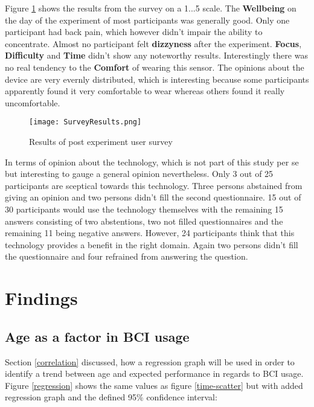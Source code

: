             Figure \ref*{survey-boxplots} shows the results from the survey on a 1...5 scale. The \textbf{Wellbeing} on the day of the experiment of most participants was generally good. Only one participant had back pain, which however didn't impair the ability to concentrate. Almost no participant felt \textbf{dizzyness} after the experiment. \textbf{Focus}, \textbf{Difficulty} and \textbf{Time} didn't show any noteworthy results. Interestingly there was no real tendency to the \textbf{Comfort} of wearing this sensor. The opinions about the device are very evernly distributed, which is interesting because some participants apparently found it very comfortable to wear whereas others found it really uncomfortable.

            \begin{figure}[h]     %
                \centering
                \texttt{[image: SurveyResults.png]} 
                \caption{Results of post experiment user survey}\label{survey-boxplots}
            \end{figure} 

            In terms of opinion about the technology, which is not part of this study per se but interesting to gauge a general opinion nevertheless. Only 3 out of 25 participants are sceptical towards this technology. Three persons abstained from giving an opinion and two persons didn't fill the second questionnaire. 15 out of 30 participants would use the technology themselves with the remaining 15 answers consisting of two abstentions, two not filled questionnaires and the remaining 11 being negative answers. However, 24 participants think that this technology provides a benefit in the right domain. Again two persons didn't fill the questionnaire and four refrained from answering the question.

    \chapter{Findings}\label{findings}

        \section{Age as a factor in BCI usage}\label{findings-age}

            Section \ref*{correlation} discussed, how a regression graph will be used in order to identify a trend between age and expected performance in regards to BCI usage. Figure \ref*{regression} shows the same values as figure \ref*{time-scatter} but with added regression graph and the defined 95\% confidence interval:

